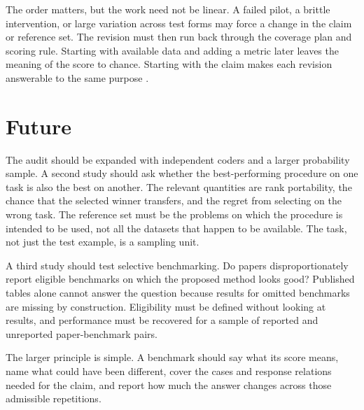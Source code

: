 \documentclass[11pt]{article}
\begin{document}
The order matters, but the work need not be linear. A failed pilot, a brittle intervention, or large variation across test forms may force a change in the claim or reference set. The revision must then run back through the coverage plan and scoring rule. Starting with available data and adding a metric later leaves the meaning of the score to chance. Starting with the claim makes each revision answerable to the same purpose \citep{gelman2026workflow}.

\section*{Future}

The audit should be expanded with independent coders and a larger probability sample. A second study should ask whether the best-performing procedure on one task is also the best on another. The relevant quantities are rank portability, the chance that the selected winner transfers, and the regret from selecting on the wrong task. The reference set must be the problems on which the procedure is intended to be used, not all the datasets that happen to be available. The task, not just the test example, is a sampling unit.

A third study should test selective benchmarking. Do papers disproportionately report eligible benchmarks on which the proposed method looks good? Published tables alone cannot answer the question because results for omitted benchmarks are missing by construction. Eligibility must be defined without looking at results, and performance must be recovered for a sample of reported and unreported paper-benchmark pairs.

The larger principle is simple. A benchmark should say what its score means, name what could have been different, cover the cases and response relations needed for the claim, and report how much the answer changes across those admissible repetitions.



\end{document}

